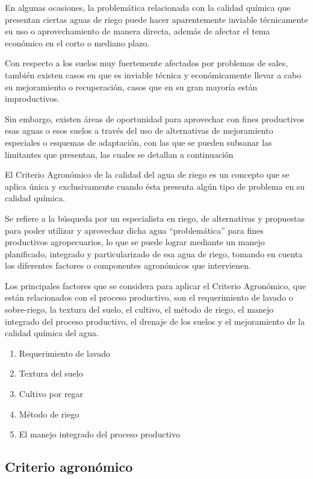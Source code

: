 En algunas ocasiones, la problemática relacionada con la calidad química que presentan ciertas aguas de riego puede hacer aparentemente inviable técnicamente su uso o aprovechamiento de manera directa, además de afectar el tema económico en el corto o mediano plazo.

Con respecto a los suelos muy fuertemente afectados por problemas de sales, también existen casos en que es inviable técnica y económicamente llevar a cabo su mejoramiento o recuperación, casos que en su gran mayoría están improductivos.

Sin embargo, existen áreas de oportunidad para aprovechar con fines productivos esas aguas o esos suelos a través del uso de alternativas de mejoramiento especiales o esquemas de adaptación, con las que se pueden subsanar las limitantes que presentan, las cuales se detallan a continuación

El Criterio Agronómico de la calidad del agua de riego es un concepto que se aplica única y exclusivamente cuando ésta presenta algún tipo de problema en su calidad química.

Se refiere a la búsqueda por un especialista en riego, de alternativas y propuestas para poder utilizar y aprovechar dicha agua “problemática” para fines productivos agropecuarios, lo que se puede lograr mediante un manejo planificado, integrado y particularizado de esa agua de riego, tomando en cuenta los diferentes factores o componentes agronómicos que intervienen.

Los principales factores que se considera para aplicar el Criterio Agronómico, que están relacionados con el proceso productivo, son el requerimiento de lavado o sobre-riego, la textura del suelo, el cultivo, el método de riego, el manejo integrado del proceso productivo, el drenaje de los suelos y el mejoramiento de la calidad química del agua.

\begin{enumerate}
    \item Requerimiento de lavado
    \item Textura del suelo
    \item Cultivo por regar
    \item Método de riego
    \item El manejo integrado del proceso productivo
\end{enumerate}

\subsection{Criterio agronómico} 
